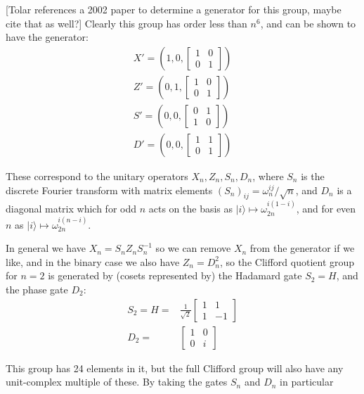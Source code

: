 \documentclass[]{article}
\newcommand{\ket}[1]{| #1 \rangle}
\begin{document}
[Tolar references a 2002 paper to determine a generator for this group, maybe cite that as well?]
Clearly this group has order less than $n^6$, and can be shown to have the generator:
\begin{align*}
X' = \left(1, 0, \left[\begin{matrix}
1&0\\
0&1
\end{matrix}\right]\right)
\\
Z' = \left(0, 1, \left[\begin{matrix}
1&0\\
0&1
\end{matrix}\right]\right)
\\
S' = \left(0, 0, \left[\begin{matrix}
0&1\\
1&0
\end{matrix}\right]\right)
\\
D' = \left(0, 0, \left[\begin{matrix}
1&1\\
0&1
\end{matrix}\right]\right)
\end{align*}

These correspond to the unitary operators $X_n, Z_n, S_n, D_n$, where $S_n$ is the discrete Fourier transform with matrix elements $(S_n)_{ij} = \omega_n^{ij}/\sqrt{n}$, and $D_n$ is a diagonal matrix which for odd $n$ acts on the basis as $\ket{i} \mapsto \omega_{2n}^{i(1-i)}$, and for even $n$ as $\ket{i} \mapsto \omega_{2n}^{i(n-i)}$.

In general we have $X_n = S_nZ_nS_n^{-1}$ so we can remove $X_n$ from the generator if we like, and in the binary case we also have $Z_n = D_n^2$, so the Clifford quotient group for $n=2$ is generated by (cosets represented by) the Hadamard gate $S_2=H$, and the phase gate $D_2$:
\begin{align*}
S_2 = H =& \frac{1}{\sqrt{2}}\left[\begin{matrix}
1&1\\
1&-1
\end{matrix}\right]
\\
D_2 =& \left[\begin{matrix}
1&0\\
0&i
\end{matrix}\right]
\end{align*}

This group has 24 elements in it, but the full Clifford group will also have any unit-complex multiple of these. By taking the gates $S_n$ and $D_n$ in particular 
\end{document}

